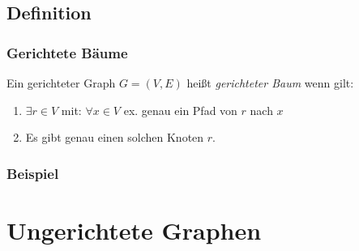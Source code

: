 \subsection{Definition}
\begin{frame}
	\frametitle{Gerichtete Bäume}
	\begin{definition}
    Ein gerichteter Graph $G = (V, E)$ heißt \emph{gerichteter Baum} wenn gilt:
		\begin{enumerate}
			\item $\exists r \in V$ mit: $\forall x\in V$ ex. genau ein Pfad von $r$ nach $x$ \pause
			\item Es gibt genau einen solchen Knoten $r$.
		\end{enumerate}
	\end{definition}
\end{frame}
\begin{frame}[fragile]
  \frametitle{Beispiel}
    \begin{figure}
    \end{figure}
\end{frame}

\section{Ungerichtete Graphen}
